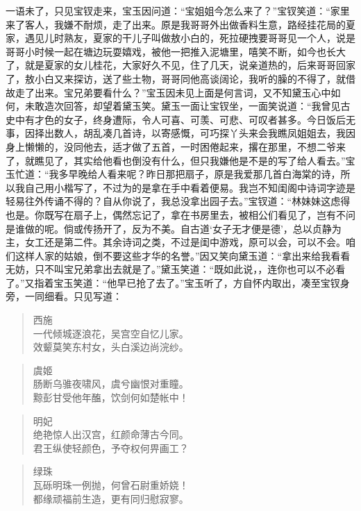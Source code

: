 \documentclass[12pt,oneside]{book}
\newenvironment{shici}{%
\begin{verse}%
\centering\large\hspace{12pt}}%
{\end{verse}}
\begin{document}
一语未了，只见宝钗走来，宝玉因问道：“宝姐姐今怎么来了？”宝钗笑道：“家里来了客人，我嫌不耐烦，走了出来。原是我哥哥外出做香料生意，路经挂花局的夏家，遇见儿时熟友，夏家的干儿子叫做敖小白的，死拉硬拽要哥哥见一个人，说是哥哥小时候一起在塘边玩耍嬉戏，被他一把推入泥塘里，嘻笑不断，如今也长大了，就是夏家的女儿桂花，大家好久不见，住了几天，说亲道热的，后来哥哥回家了，敖小白又来探访，送了些土物，哥哥同他高谈阔论，我听的臊的不得了，就借故走了出来。宝兄弟要看什么？”宝玉因未见上面是何言词，又不知黛玉心中如何，未敢造次回答，却望着黛玉笑。黛玉一面让宝钗坐，一面笑说道：“我曾见古史中有才色的女子，终身遭际，令人可喜、可羡、可悲、可叹者甚多。今日饭后无事，因择出数人，胡乱凑几首诗，以寄感慨，可巧探丫头来会我瞧凤姐姐去，我因身上懒懒的，没同他去，适才做了五首，一时困倦起来，撂在那里，不想二爷来了，就瞧见了，其实给他看也倒没有什么，但只我嫌他是不是的写了给人看去。”宝玉忙道：“我多早晚给人看来呢？昨日那把扇子，原是我爱那几首白海棠的诗，所以我自己用小楷写了，不过为的是拿在手中看着便易。我岂不知闺阁中诗词字迹是轻易往外传诵不得的？自从你说了，我总没拿出园子去。”宝钗道：“林妹妹这虑得也是。你既写在扇子上，偶然忘记了，拿在书房里去，被相公们看见了，岂有不问是谁做的呢。倘或传扬开了，反为不美。自古道‘女子无才便是德’，总以贞静为主，女工还是第二件。其余诗词之类，不过是闺中游戏，原可以会，可以不会。咱们这样人家的姑娘，倒不要这些才华的名誉。”因又笑向黛玉道：“拿出来给我看看无妨，只不叫宝兄弟拿出去就是了。”黛玉笑道：“既如此说，，连你也可以不必看了。”又指着宝玉笑道：“他早已抢了去了。”宝玉听了，方自怀内取出，凑至宝钗身旁，一同细看。只见写道：

\begin{shici}
西施\\
一代倾城逐浪花，吴宫空自忆儿家。\\
效颦莫笑东村女，头白溪边尚浣纱。
\end{shici}


\begin{shici}
虞姬\\
肠断乌骓夜啸风，虞兮幽恨对重瞳。\\
黥彭甘受他年醢，饮剑何如楚帐中！
\end{shici}

\begin{shici}
明妃\\
绝艳惊人出汉宫，红颜命薄古今同。\\
君王纵使轻颜色，予夺权何畀画工？
\end{shici}

\begin{shici}
绿珠\\
瓦砾明珠一例抛，何曾石尉重娇娆！\\
都缘顽福前生造，更有同归慰寂寥。
\end{shici}
\end{document}
